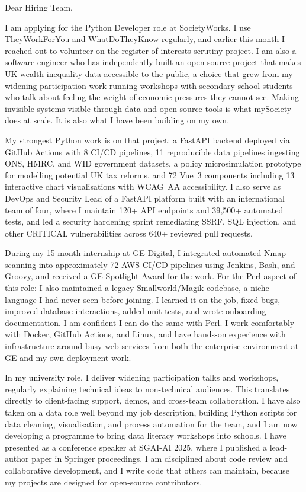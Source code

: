 \documentclass[11pt,a4paper]{article}
\begin{document}
Dear Hiring Team,

I am applying for the Python Developer role at SocietyWorks. I use
TheyWorkForYou and WhatDoTheyKnow regularly, and earlier this month I
reached out to volunteer on the register-of-interests scrutiny project. I
am also a software engineer who has independently built an open-source
project that makes UK wealth inequality data accessible to the public, a
choice that grew from my widening participation work running workshops with
secondary school students who talk about feeling the weight of economic
pressures they cannot see. Making invisible systems visible through data
and open-source tools is what mySociety does at scale. It is also what I
have been building on my own.

My strongest Python work is on that project: a FastAPI backend deployed via
GitHub Actions with 8 CI/CD pipelines, 11 reproducible data pipelines
ingesting ONS, HMRC, and WID government datasets, a policy
microsimulation prototype for modelling potential UK tax reforms, and 72
Vue~3 components including 13 interactive chart visualisations with
WCAG~AA accessibility. I also serve as DevOps and Security Lead of a
FastAPI platform built with an international team of four, where I
maintain 120+ API endpoints and 39{,}500+ automated tests, and led a
security hardening sprint remediating SSRF, SQL injection, and other
CRITICAL vulnerabilities across 640+ reviewed pull requests.

During my 15-month internship at GE Digital, I integrated automated Nmap
scanning into approximately 72 AWS CI/CD pipelines using Jenkins, Bash,
and Groovy, and received a GE Spotlight Award for the work. For the Perl
aspect of this role: I also maintained a legacy Smallworld/Magik codebase,
a niche language I had never seen before joining. I learned it on the job,
fixed bugs, improved database interactions, added unit tests, and wrote
onboarding documentation. I am confident I can do the same with Perl. I
work comfortably with Docker, GitHub Actions, and Linux, and have hands-on
experience with infrastructure around busy web services from both the
enterprise environment at GE and my own deployment work.

In my university role, I deliver widening participation talks and
workshops, regularly explaining technical ideas to non-technical audiences.
This translates directly to client-facing support, demos, and cross-team
collaboration. I have also taken on a data role well beyond my job
description, building Python scripts for data cleaning, visualisation, and
process automation for the team, and I am now developing a programme to
bring data literacy workshops into schools. I have presented as a
conference speaker at SGAI-AI 2025, where I published a lead-author paper
in Springer proceedings. I am disciplined about code review and
collaborative development, and I write code that others can maintain,
because my projects are designed for open-source contributors.
\end{document}
